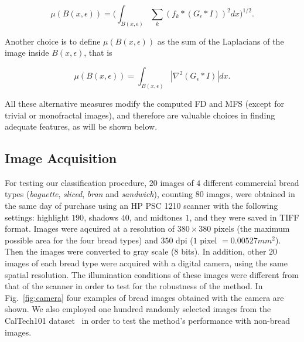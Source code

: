 \begin{equation}
\mu(B(x,\epsilon)) = (\int_{B(x,\epsilon)}{\sum_{k}{(f_{k} \ast (G_{\epsilon} \ast I))^{2}} dx)^{1/2}}.
\label{eqn:gradient}
\end{equation}

Another choice is to define $\mu(B(x, \epsilon))$ as the sum of the Laplacians of the image inside $B(x, \epsilon)$, that is

\begin{equation}
\mu(B(x,\epsilon)) = \int_{B(x,\epsilon)}|\nabla^2 (G_{\epsilon} \ast I)| dx.
\label{eqn:laplacian}
\end{equation}

All these alternative measures modify the computed FD and MFS (except for trivial or monofractal images), and therefore are valuable choices in finding adequate features, as will be shown below.

\subsection{Image Acquisition}
\label{sec:7}
For testing our classification procedure, $20$ images of $4$ different commercial bread types ({\em baguette}, {\em sliced}, {\em bran} and {\em sandwich}), counting $80$ images, were obtained in the same day of purchase using an HP PSC 1210 scanner with the following settings: highlight $190$, shadows $40$, and midtones $1$, and they were saved in TIFF format. Images were aqcuired at a resolution of $380 \times 380$ pixels (the maximum possible area for the four bread types) and $350$ dpi ($1$ pixel $= 0.00527 mm^{2}$). Then the images were converted to gray scale ($8$ bits). In addition, other $20$ images of each bread type were acquired with a digital camera, using the same spatial resolution. The illumination conditions of these images were different from that of the scanner in order to test for the robustness of the method. In Fig.~\ref{fig:camera} four examples of bread images obtained with the camera are shown. We also employed one hundred randomly selected images from the CalTech101 dataset~\cite{FeiFei04} in order to test the method's performance with non-bread images.

